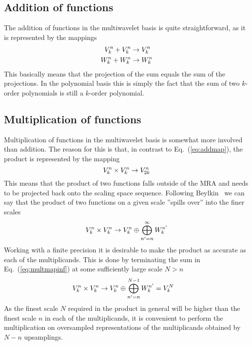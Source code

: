 \subsection{Addition of functions}\label{sec:addition}
The addition of functions in the multiwavelet basis is quite straightforward, 
as it is represented by the mappings
\begin{align}
    \label{eq:addmap}
    \begin{split}
	{V}_{k}^{n} + {V}_{k}^{n} &\rightarrow {V}_{k}^{n}\\
	{W}_{k}^{n} + {W}_{k}^{n} &\rightarrow {W}_{k}^{n}
    \end{split}
\end{align}
This basically means that the projection of the sum equals the sum of the
projections. In the polynomial basis this is simply the fact that the sum of
two $k$-order polynomials is still a $k$-order polynomial.

\subsection{Multiplication of functions}\label{sec:multiplication}
Multiplication of functions in the multiwavelet basis is somewhat more
involved than addition. The reason for this is that, in contrast to
Eq.~(\ref{eq:addmap}), the product is represented by the mapping
\begin{equation}
    \label{eq:multmap}
    {V}_{k}^{n} \times {V}_{k}^{n} \rightarrow V^n_{2k}
\end{equation}
This means that the product of two functions falls outside of the MRA and needs 
to be projected back onto the scaling space sequence. Following 
Beylkin~\cite{Beylkin:1992} we can say that the product of two functions on a given 
scale ''spills over'' into the finer scales
\begin{equation}
    \label{eq:multmapinf}
    {V}_{k}^{n} \times {V}_{k}^{n} \rightarrow {V}_{k}^{n} \oplus 
	\bigoplus_{n'=n}^{\infty} {W}_{k}^{n'}
\end{equation}
Working with a finite precision it is desirable to make the product as accurate
as each of the multiplicands. This is done by terminating the sum in
Eq.~(\ref{eq:multmapinf}) at some sufficiently large scale $N>n$
\begin{align}
    \label{eq:multmapN}
    {V}_{k}^{n} \times {V}_{k}^{n} \rightarrow {V}_{k}^{n} \oplus 
	\bigoplus_{n'=n}^{N-1} {W}_{k}^{n'} &= {V}_{k}^{N}
\end{align}
As the finest scale $N$ required in the product in general will be higher than the
finest scale $n$ in each of the multiplicands, it is convenient to perform the
multiplication on oversampled representations of the multiplicands obtained by
$N-n$ upsamplings.

